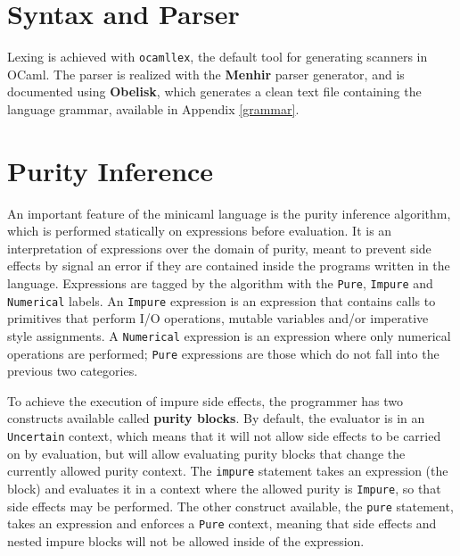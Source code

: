 \documentclass[a4paper, 10pt]{article}
\theoremstyle{plain}%
\theoremstyle{definition}
\theoremstyle{remark}
\begin{document}
\begin{multicols}{2}

\section{Syntax and Parser}
Lexing is achieved with \texttt{ocamllex}, the default tool for generating
scanners in OCaml.
The parser is realized with the \textbf{Menhir} parser generator, and is
documented using \textbf{Obelisk}, which generates a clean text file
containing the language grammar, available in Appendix \ref{grammar}.

\section{Purity Inference}
An important feature of the minicaml language is the purity inference algorithm,
which is performed statically on expressions before evaluation. It is an interpretation of expressions over the domain of purity, meant to
prevent side effects by signal an error if they are contained inside the
programs written in the language. Expressions are tagged by the algorithm with
the \texttt{Pure}, \texttt{Impure} and \texttt{Numerical} labels. An
\texttt{Impure} expression is an expression that contains calls to primitives
that perform I/O operations, mutable variables and/or imperative style
assignments. A \texttt{Numerical} expression is an expression where only
numerical operations are performed; \texttt{Pure} expressions are those which do not fall into the previous two
categories.

To achieve the execution of impure side effects, the programmer has two constructs
available called \textbf{purity blocks}. By default, the evaluator is in an
\texttt{Uncertain} context, which means that it will not allow side effects to
be carried on by evaluation, but will allow evaluating purity blocks that change
the currently allowed purity context. The \texttt{impure} statement takes an
expression (the block) and evaluates it in a context where the allowed purity is
\texttt{Impure}, so that side effects may be performed. The other construct
available, the \texttt{pure} statement, takes an expression and enforces a
\texttt{Pure} context, meaning that side effects and nested impure blocks will
not be allowed inside of the expression.


\end{multicols}
\end{document}
